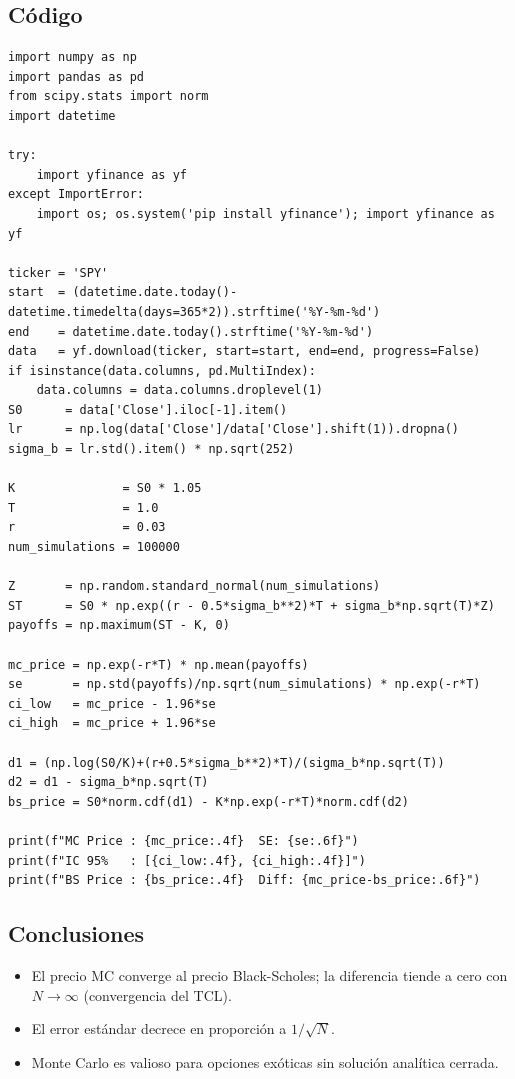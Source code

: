 \documentclass[12pt,letterpaper]{article}
\begin{document}
\subsection{C\'odigo}

\begin{lstlisting}[style=python, caption={Laboratorio 3 -- Monte Carlo europeo}]
import numpy as np
import pandas as pd
from scipy.stats import norm
import datetime

try:
    import yfinance as yf
except ImportError:
    import os; os.system('pip install yfinance'); import yfinance as yf

ticker = 'SPY'
start  = (datetime.date.today()-datetime.timedelta(days=365*2)).strftime('%Y-%m-%d')
end    = datetime.date.today().strftime('%Y-%m-%d')
data   = yf.download(ticker, start=start, end=end, progress=False)
if isinstance(data.columns, pd.MultiIndex):
    data.columns = data.columns.droplevel(1)
S0      = data['Close'].iloc[-1].item()
lr      = np.log(data['Close']/data['Close'].shift(1)).dropna()
sigma_b = lr.std().item() * np.sqrt(252)

K               = S0 * 1.05
T               = 1.0
r               = 0.03
num_simulations = 100000

Z       = np.random.standard_normal(num_simulations)
ST      = S0 * np.exp((r - 0.5*sigma_b**2)*T + sigma_b*np.sqrt(T)*Z)
payoffs = np.maximum(ST - K, 0)

mc_price = np.exp(-r*T) * np.mean(payoffs)
se       = np.std(payoffs)/np.sqrt(num_simulations) * np.exp(-r*T)
ci_low   = mc_price - 1.96*se
ci_high  = mc_price + 1.96*se

d1 = (np.log(S0/K)+(r+0.5*sigma_b**2)*T)/(sigma_b*np.sqrt(T))
d2 = d1 - sigma_b*np.sqrt(T)
bs_price = S0*norm.cdf(d1) - K*np.exp(-r*T)*norm.cdf(d2)

print(f"MC Price : {mc_price:.4f}  SE: {se:.6f}")
print(f"IC 95%   : [{ci_low:.4f}, {ci_high:.4f}]")
print(f"BS Price : {bs_price:.4f}  Diff: {mc_price-bs_price:.6f}")
\end{lstlisting}

\subsection{Conclusiones}

\begin{itemize}
  \item El precio MC converge al precio Black-Scholes; la diferencia tiende a
    cero con $N \to \infty$ (convergencia del TCL).
  \item El error est\'andar decrece en proporci\'on a $1/\sqrt{N}$.
  \item Monte Carlo es valioso para opciones ex\'oticas sin soluci\'on anal\'itica
    cerrada.
\end{itemize}
\end{document}

